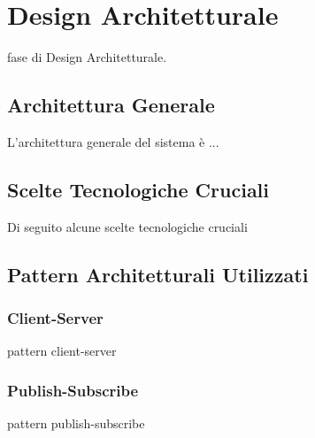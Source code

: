 

\chapter{Design Architetturale}
     fase di Design Architetturale.
    \section{Architettura Generale}
    L'architettura generale del sistema è ...
    
    \section{Scelte Tecnologiche Cruciali}
    Di seguito alcune scelte tecnologiche cruciali

    \section{Pattern Architetturali Utilizzati}
        \subsection{Client-Server}
        pattern client-server 
    
        \subsection{Publish-Subscribe}
        pattern publish-subscribe
        
        